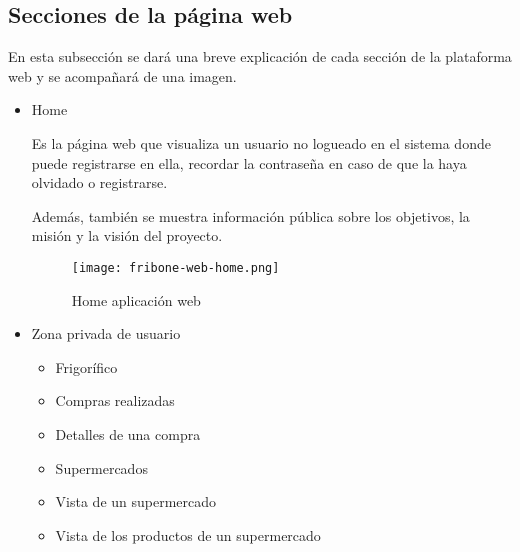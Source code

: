 \subsection{Secciones de la página web}

    En esta subsección se dará una breve explicación de cada sección de la plataforma web y se acompañará de una imagen.

    \begin{itemize}
        \item Home

        Es la página web que visualiza un usuario no logueado en el sistema donde puede registrarse en ella, recordar la contraseña en caso de que la haya olvidado o registrarse.

        Además, también se muestra información pública sobre los objetivos, la misión y la visión del proyecto.

            \begin{figure}[H]
                \centering
                \texttt{[image: fribone-web-home.png]}
                \caption{Home aplicación web}\label{fig:fribone-web-home}
            \end{figure}


        \item Zona privada de usuario

            \begin{itemize}
                \item Frigorífico

                \item Compras realizadas

                \item Detalles de una compra

                \item Supermercados

                \item Vista de un supermercado

                \item Vista de los productos de un supermercado
            \end{itemize}
    \end{itemize}
